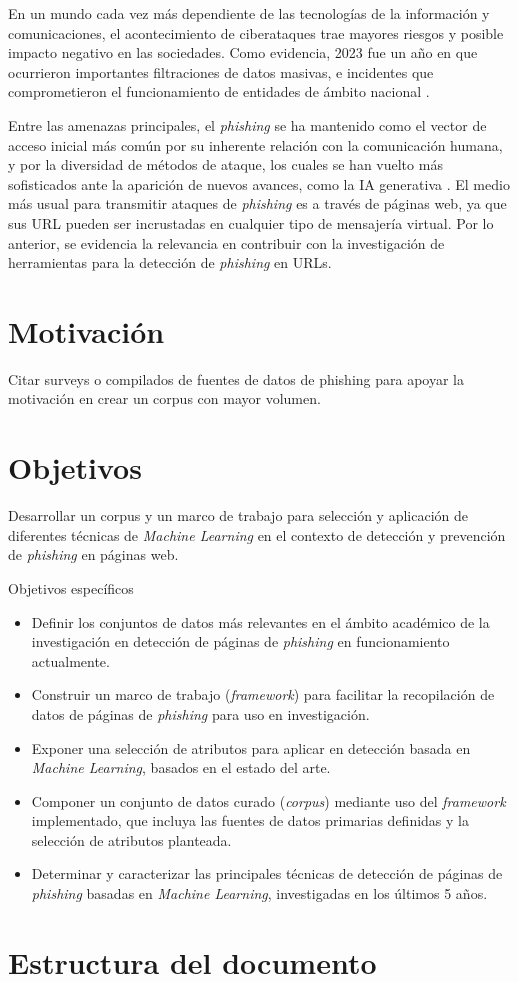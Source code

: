 
En un mundo cada vez más dependiente de las tecnologías de la información y comunicaciones, el acontecimiento de ciberataques trae mayores riesgos y posible impacto negativo en las sociedades. Como evidencia, 2023 fue un año en que ocurrieron importantes filtraciones de datos masivas, e incidentes que comprometieron el funcionamiento de entidades de ámbito nacional \cite{moore2023}.

Entre las amenazas principales, el \textit{phishing} se ha mantenido como el vector de acceso inicial más común por su inherente relación con la comunicación humana, y por la diversidad de métodos de ataque, los cuales se han vuelto más sofisticados ante la aparición de nuevos avances, como la IA generativa \cite{enisa2023}. El medio más usual para transmitir ataques de \textit{phishing} es a través de páginas web, ya que sus URL pueden ser incrustadas en cualquier tipo de mensajería virtual. Por lo anterior, se evidencia la relevancia en contribuir con la investigación de herramientas para la detección de \textit{phishing} en URLs.

\section{Motivación}

Citar surveys o compilados de fuentes de datos de phishing para apoyar la motivación en crear un corpus con mayor volumen.

\section{Objetivos}

Desarrollar un corpus y un marco de trabajo para selección y aplicación de diferentes técnicas de \textit{Machine Learning} en el contexto de detección y prevención de \textit{phishing} en páginas web.

Objetivos específicos

\begin{itemize}
    \item Definir los conjuntos de datos más relevantes en el ámbito académico de la investigación en detección de páginas de \textit{phishing} en funcionamiento actualmente.
    \item Construir un marco de trabajo (\textit{framework}) para facilitar la recopilación de datos de páginas de \textit{phishing} para uso en investigación.
    \item Exponer una selección de atributos para aplicar en detección basada en \textit{Machine Learning}, basados en el estado del arte.
    \item Componer un conjunto de datos curado (\textit{corpus}) mediante uso del \textit{framework} implementado, que incluya las fuentes de datos primarias definidas y la selección de atributos planteada.
    \item Determinar y caracterizar las principales técnicas de detección de páginas de \textit{phishing} basadas en \textit{Machine Learning}, investigadas en los últimos 5 años.
\end{itemize}

\section{Estructura del documento}